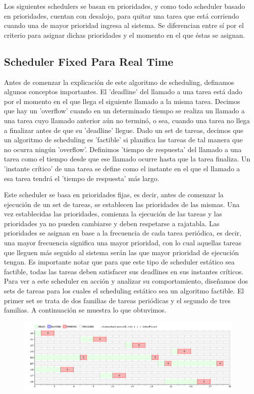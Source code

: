 Los siguientes schedulers se basan en prioridades, y como todo scheduler basado en prioridades, cuentan con desalojo, para quitar una tarea que está corriendo cuando una de mayor prioridad ingresa al sistema. Se diferencian entre sí por el criterio para asignar dichas prioridades y el momento en el que éstas se asignan.

\subsection{Scheduler Fixed Para Real Time}
Antes de comenzar la explicación de este algoritmo de scheduling, definamos algunos conceptos importantes. El 'deadline' del llamado a una tarea está dado por el momento en el que llega el siguiente llamado a la misma tarea. Decimos que hay un 'overflow' cuando en un determinado tiempo se realiza un llamado a una tarea cuyo llamado anterior aún no terminó, o sea, cuando una tarea no llega a finalizar antes de que su 'deadline' llegue. Dado un set de tareas, decimos que un algoritmo de scheduling es 'factible' si planifica las tareas de tal manera que no ocurra ningún 'overflow'. Definimos 'tiempo de respuesta' del llamado a una tarea como el tiempo desde que ese llamado ocurre hasta que la tarea finaliza. Un 'instante crítico' de una tarea se define como el instante en el que el llamado a esa tarea tendrá el 'tiempo de respuesta' más largo.

Este scheduler se basa en prioridades fijas, es decir, antes de comenzar la ejecución de un set de tareas, se establecen las prioridades de las mismas. Una vez establecidas las prioridades, comienza la ejecución de las tareas y las prioridades ya no pueden cambiarse y deben respetarse a rajatabla. Las prioridades se asignan en base a la frecuencia de cada tarea periódica, es decir, una mayor frecuencia significa una mayor prioridad, con lo cual aquellas tareas que lleguen más seguido al sistema serán las que mayor prioridad de ejecución tengan. Es importante notar que para que este tipo de scheduler estático sea factible, todas las tareas deben satisfacer sus deadlines en sus instantes críticos.
\\

Para ver a este scheduler en acción y analizar su comportamiento, diseñamos dos sets de tareas para los cuales el scheduling estático sea un algoritmo factible. El primer set se trata de dos familias de tareas periódicas y el segundo de tres familias. A continuación se muestra lo que obtuvimos.

\begin{figure}[H]
  \centering
\includegraphics[scale=0.45]{fixed/period2.png}
  \caption[test 1]{}
\end{figure}

